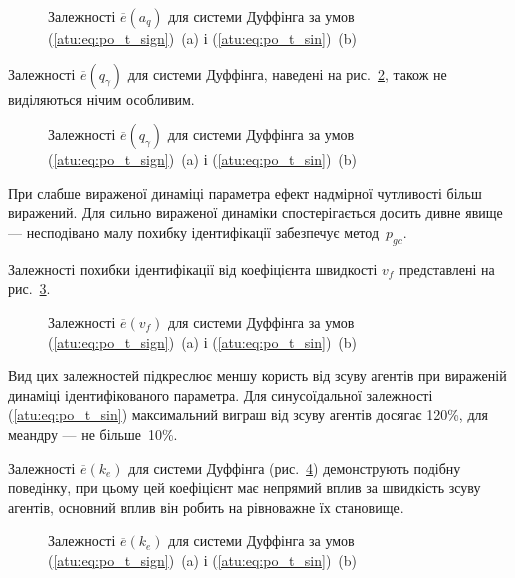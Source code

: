 \begin{figure}[ht!]
  \caption{Залежності $\overline{e}(a_q)$ для системи Дуффінга за умов (\ref{atu:eq:po_t_sign})~(a) і (\ref{atu:eq:po_t_sin})~(b)}
\label{atu:f:duff_e_a_q}
\end{figure}

Залежності
$ \overline{e} (q_\gamma) $ для системи Дуффінга, наведені на
рис.~\ref{atu:f:duff_e_q_gamma}, також не виділяються нічим особливим.

\begin{figure}[ht!]
  \caption{Залежності $ \overline{e} (q_\gamma) $ для системи Дуффінга за умов (\ref{atu:eq:po_t_sign})~(a) і (\ref{atu:eq:po_t_sin})~(b)}
\label{atu:f:duff_e_q_gamma}
\end{figure}

При слабше вираженої динаміці параметра ефект надмірної
чутливості більш виражений. Для сильно вираженої динаміки
спостерігається досить дивне явище --- несподівано малу похибку
ідентифікації забезпечує метод~$p_{gc}$.

Залежності похибки ідентифікації від коефіцієнта швидкості $ v_f $ представлені на рис.~\ref{atu:f:duff_e_v_f}.

\begin{figure}[ht!]
  \caption{Залежності $\overline{e}(v_f)$ для системи Дуффінга за умов (\ref{atu:eq:po_t_sign})~(a) і (\ref{atu:eq:po_t_sin})~(b)}
\label{atu:f:duff_e_v_f}
\end{figure}

Вид цих залежностей підкреслює меншу користь від зсуву агентів
при вираженій динаміці ідентифікованого параметра. Для
синусоїдальної залежності (\ref{atu:eq:po_t_sin}) максимальний виграш
від зсуву агентів досягає 120\%, для меандру --- не більше~10\%.

Залежності
$\overline{e} (k_e) $ для системи Дуффінга (рис.~\ref{atu:f:duff_e_k_e}) демонструють
подібну поведінку, при цьому цей коефіцієнт має непрямий
вплив за швидкість зсуву агентів, основний вплив він робить на
рівноважне їх становище.

\begin{figure}[ht!]
  \caption{Залежності $\overline{e}(k_e)$ для системи Дуффінга за умов (\ref{atu:eq:po_t_sign})~(a) і (\ref{atu:eq:po_t_sin})~(b)}
\label{atu:f:duff_e_k_e}
\end{figure}

